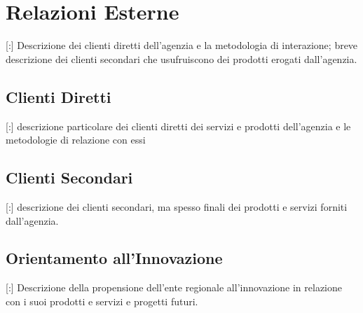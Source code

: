 \section{Relazioni Esterne}

[:] Descrizione dei clienti diretti dell'agenzia e la metodologia di interazione; breve descrizione dei clienti secondari che usufruiscono dei prodotti erogati dall'agenzia.

\subsection{Clienti Diretti}

[:]  descrizione particolare dei clienti diretti dei servizi e prodotti dell'agenzia e le metodologie di relazione con essi

\subsection{Clienti Secondari}

[:] descrizione dei clienti secondari, ma spesso finali dei prodotti e servizi forniti dall'agenzia.

\subsection{Orientamento all'Innovazione}

[:] Descrizione della propensione dell'ente regionale all'innovazione in relazione con i suoi prodotti e servizi e progetti futuri.

